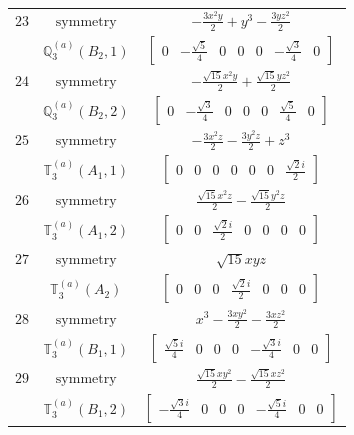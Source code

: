 \documentclass[fleqn,8pt,landscape]{jsarticle}
\begin{document}
\begin{longtable}{ccc}
$ 23 $ & $ \text{symmetry} $ & $ - \frac{3 x^{2} y}{2} + y^{3} - \frac{3 y z^{2}}{2} $ \\
$  $ & $ \mathbb{Q}_{3}^{(a)}(B_{2},1) $ & $ \begin{bmatrix} 0 & - \frac{\sqrt{5}}{4} & 0 & 0 & 0 & - \frac{\sqrt{3}}{4} & 0 \end{bmatrix} $ \\ \hline
$ 24 $ & $ \text{symmetry} $ & $ - \frac{\sqrt{15} x^{2} y}{2} + \frac{\sqrt{15} y z^{2}}{2} $ \\
$  $ & $ \mathbb{Q}_{3}^{(a)}(B_{2},2) $ & $ \begin{bmatrix} 0 & - \frac{\sqrt{3}}{4} & 0 & 0 & 0 & \frac{\sqrt{5}}{4} & 0 \end{bmatrix} $ \\ \hline
$ 25 $ & $ \text{symmetry} $ & $ - \frac{3 x^{2} z}{2} - \frac{3 y^{2} z}{2} + z^{3} $ \\
$  $ & $ \mathbb{T}_{3}^{(a)}(A_{1},1) $ & $ \begin{bmatrix} 0 & 0 & 0 & 0 & 0 & 0 & \frac{\sqrt{2} i}{2} \end{bmatrix} $ \\ \hline
$ 26 $ & $ \text{symmetry} $ & $ \frac{\sqrt{15} x^{2} z}{2} - \frac{\sqrt{15} y^{2} z}{2} $ \\
$  $ & $ \mathbb{T}_{3}^{(a)}(A_{1},2) $ & $ \begin{bmatrix} 0 & 0 & \frac{\sqrt{2} i}{2} & 0 & 0 & 0 & 0 \end{bmatrix} $ \\ \hline
$ 27 $ & $ \text{symmetry} $ & $ \sqrt{15} x y z $ \\
$  $ & $ \mathbb{T}_{3}^{(a)}(A_{2}) $ & $ \begin{bmatrix} 0 & 0 & 0 & \frac{\sqrt{2} i}{2} & 0 & 0 & 0 \end{bmatrix} $ \\ \hline
$ 28 $ & $ \text{symmetry} $ & $ x^{3} - \frac{3 x y^{2}}{2} - \frac{3 x z^{2}}{2} $ \\
$  $ & $ \mathbb{T}_{3}^{(a)}(B_{1},1) $ & $ \begin{bmatrix} \frac{\sqrt{5} i}{4} & 0 & 0 & 0 & - \frac{\sqrt{3} i}{4} & 0 & 0 \end{bmatrix} $ \\ \hline
$ 29 $ & $ \text{symmetry} $ & $ \frac{\sqrt{15} x y^{2}}{2} - \frac{\sqrt{15} x z^{2}}{2} $ \\
$  $ & $ \mathbb{T}_{3}^{(a)}(B_{1},2) $ & $ \begin{bmatrix} - \frac{\sqrt{3} i}{4} & 0 & 0 & 0 & - \frac{\sqrt{5} i}{4} & 0 & 0 \end{bmatrix} $ \\ \hline

\end{longtable}
\end{document}
